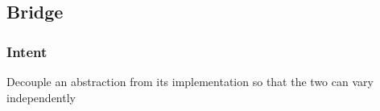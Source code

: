 \documentclass[10pt,xcolor={usenames,dvipsnames}]{beamer}
\begin{document}
\subsection{Bridge}
\begin{frame}[fragile]
	\frametitle{Intent}
	\begin{exampleblock}{}
	Decouple an abstraction from its implementation so that the two can vary independently
	\end{exampleblock}
\end{frame}
% 
% 
% 
% 
% 
% 
% 
\end{document}
